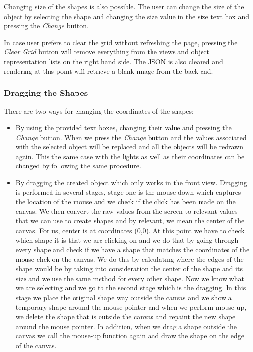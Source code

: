 \documentclass[10pt]{scrartcl}
\begin{document}
Changing size of the shapes is also possible. The user can change the size of the object by selecting the shape and changing the size value in the size text box and pressing the \textit{Change} button. \par
In case user prefers to clear the grid without refreshing the page, pressing the \textit{Clear Grid} button will remove everything from the views and object representation lists on the right hand side. The JSON is also cleared and rendering at this point will retrieve a blank image from the back-end. 

\subsubsection{Dragging the Shapes}
There are two ways for changing the coordinates of the shapes: 
\begin{itemize}
    \item By using the provided text boxes, changing their value and pressing the \textit{Change} button. When we press the \textit{Change} button and the values associated with the selected object will be replaced and all the objects will be redrawn again. This the same case with the lights as well as their coordinates can be changed by following the same procedure.
    \item By dragging the created object which only works in the front view. Dragging is performed in several stages, stage one is the mouse-down which captures the location of the mouse and we check if the click has been made on the canvas. We then convert the raw values from the screen to relevant values that we can use to create shapes and by relevant, we mean the center of the canvas. For us, center is at coordinates (0,0). At this point we have to check which shape it is that we are clicking on and we do that by going through every shape and check if we have a shape that matches the coordinates of the mouse click on the canvas. We do this by calculating where the edges of the shape would be by taking into consideration the center of the shape and its size and we use the same method for every other shape. Now we know what we are selecting and we go to the second stage which is the dragging. In this stage we place the original shape way outside the canvas and we show a temporary shape around the mouse pointer and when we perform mouse-up, we delete the shape that is outside the canvas and repaint the new shape around the mouse pointer. In addition, when we drag a shape outside the canvas we call the mouse-up function again and draw the shape on the edge of the canvas.
\end{itemize} 
\end{document}

